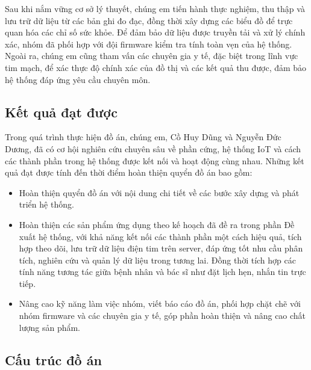 Sau khi nắm vững cơ sở lý thuyết, chúng em tiến hành thực nghiệm, thu thập và lưu trữ dữ liệu từ các bản ghi đo đạc, đồng thời xây dựng các biểu đồ để trực quan hóa các chỉ số sức khỏe. Để đảm bảo dữ liệu được truyền tải và xử lý chính xác, nhóm đã phối hợp với đội firmware kiểm tra tính toàn vẹn của hệ thống.
Ngoài ra, chúng em cũng tham vấn các chuyên gia y tế, đặc biệt trong lĩnh vực tim mạch, để xác thực độ chính xác của đồ thị và các kết quả thu được, đảm bảo hệ thống đáp ứng yêu cầu chuyên môn.
\subsection*{Kết quả đạt được}

Trong quá trình thực hiện đồ án, chúng em, Cồ Huy Dũng và Nguyễn Đức Dương, đã có cơ hội nghiên cứu chuyên sâu về phần cứng, hệ thống IoT và cách các thành phần trong hệ thống được kết nối và hoạt động cùng nhau.
Những kết quả đạt được tính đến thời điểm hoàn thiện quyển đồ án bao gồm:

\begin{adjustwidth}{1.5em}{}
  \begin{itemize}
      \item Hoàn thiện quyển đồ án với nội dung chi tiết về các bước xây dựng và phát triển hệ thống.
      \item Hoàn thiện các sản phẩm ứng dụng theo kế hoạch đã đề ra trong phần Đề xuất hệ thống, với khả năng kết nối các thành phần một cách hiệu quả, tích hợp theo dõi, lưu trữ dữ liệu điện tim trên server, đáp ứng tốt nhu cầu phân tích, nghiên cứu và quản lý dữ liệu trong tương lai.
      Đồng thời tích hợp các tính năng tương tác giữa bệnh nhân và bác sĩ như đặt lịch hẹn, nhắn tin trực tiếp.
      \item Nâng cao kỹ năng làm việc nhóm, viết báo cáo đồ án, phối hợp chặt chẽ với nhóm firmware và các chuyên gia y tế, góp phần hoàn thiện và nâng cao chất lượng sản phẩm.
    \end{itemize}
  \end{adjustwidth}
\subsection*{Cấu trúc đồ án}


